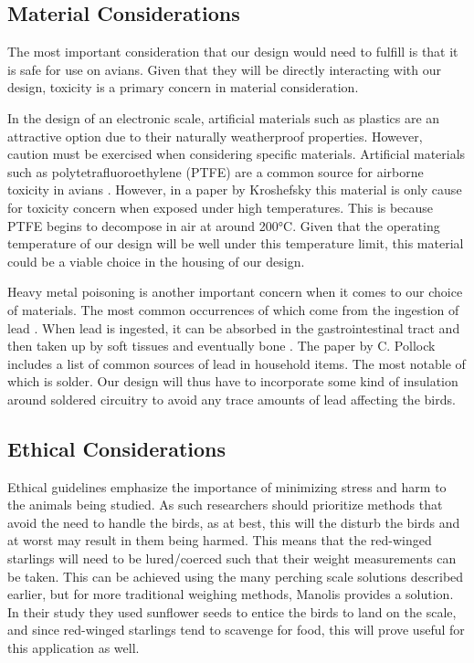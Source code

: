 \documentclass[class=report,11pt,crop=false]{standalone}
\begin{document}
\subsection{Material Considerations}
The most important consideration that our design would need to fulfill is that it is safe for use on avians. Given that they will be directly interacting with our design, toxicity is a primary concern in material consideration.

In the design of an electronic scale, artificial materials such as plastics are an attractive option due to their naturally weatherproof properties. However, caution must be exercised when considering specific materials. Artificial materials such as polytetrafluoroethylene (PTFE) are a common source for airborne toxicity in avians \cite{LightfootToxicity}. However, in a paper by Kroshefsky \cite{KroshefskyTeflon} this material is only cause for toxicity concern when exposed under high temperatures. This is because PTFE begins to decompose in air at around 200°C. Given that the operating temperature of our design will be well under this temperature limit, this material could be a viable choice in the housing of our design.

Heavy metal poisoning is another important concern when it comes to our choice of materials. The most common occurrences of which come from the ingestion of lead \cite{PollockHeavyMetal}. When lead is ingested, it can be absorbed in the gastrointestinal tract and then taken up by soft tissues and eventually bone \cite{PollockHeavyMetal}. The paper by C. Pollock includes a list of common sources of lead in household items. The most notable of which is solder. Our design will thus have to incorporate some kind of insulation around soldered circuitry to avoid any trace amounts of lead affecting the birds.

\subsection{Ethical Considerations}
Ethical guidelines emphasize the importance of minimizing stress and harm to the animals being studied. As such researchers should prioritize methods that avoid the need to handle the birds, as at best, this will the disturb the birds and at worst may result in them being harmed. This means that the red-winged starlings will need to be lured/coerced such that their weight measurements can be taken. This can be achieved using the many perching scale solutions described earlier, but for more traditional weighing methods, Manolis \cite{reid1999measurement} provides a solution. In their study they used sunflower seeds to entice the birds to land on the scale, and since red-winged starlings tend to scavenge for food, this will prove useful for this application as well. 
\end{document}

